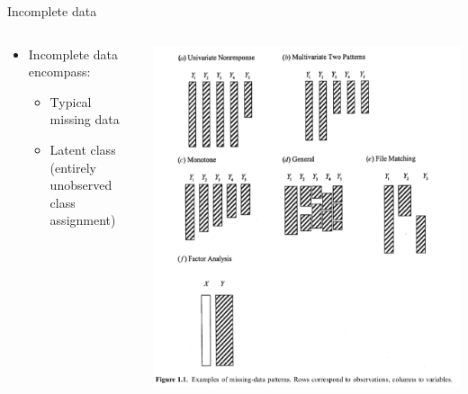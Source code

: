 \documentclass[dvipdfmx,bigger,aspectratio=169]{beamer}
\begin{document}
\begin{frame}[label={sec:org4a67d4b}]{Incomplete data}
\begin{columns}
\begin{column}{0.45\columnwidth}
\begin{itemize}
\item Incomplete data encompass:
\begin{itemize}
\item Typical missing data
\item Latent class (entirely unobserved class assignment)
\end{itemize}
\end{itemize}
\end{column}

\begin{column}{0.45\columnwidth}
\begin{center}
\includegraphics[page=1,keepaspectratio,width=\textwidth,height=0.75\textheight]{./source/missing_patterns.png}
\end{center}
\scriptsize \cite{littleStatisticalAnalysisMissing2002} \normalsize
\end{column}
\end{columns}
\end{frame}
\end{document}
